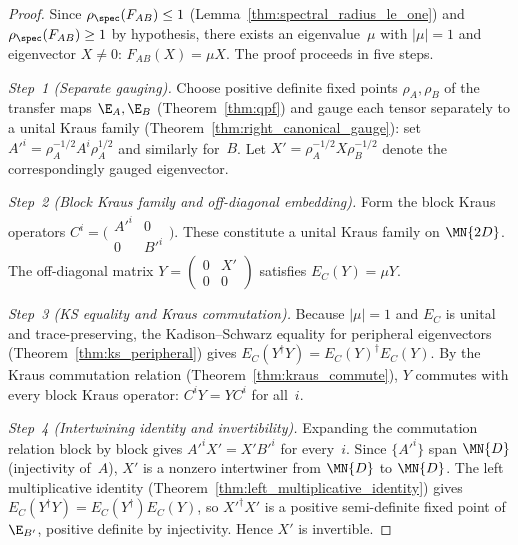 \begin{proof}
    \leanok
    Since $\rho_{\spec}(F_{AB}) \le 1$ (Lemma~\ref{thm:spectral_radius_le_one})
    and $\rho_{\spec}(F_{AB}) \ge 1$ by hypothesis, there exists an
    eigenvalue~$\mu$ with $|\mu| = 1$ and eigenvector $X \neq 0$:
    $F_{AB}(X) = \mu X$.
    The proof proceeds in five steps.

    \emph{Step~1 (Separate gauging).}
    Choose positive definite fixed points $\rho_A, \rho_B$ of the
    transfer maps $\E_A, \E_B$ (Theorem~\ref{thm:qpf}) and gauge each
    tensor separately to a unital Kraus family
    (Theorem~\ref{thm:right_canonical_gauge}): set
    $A'^i = \rho_A^{-1/2} A^i \rho_A^{1/2}$ and similarly for~$B$.
    Let $X' = \rho_A^{-1/2} X \rho_B^{-1/2}$ denote the correspondingly
    gauged eigenvector.

    \emph{Step~2 (Block Kraus family and off-diagonal embedding).}
    Form the block Kraus operators $C^i = \bigl(\begin{smallmatrix}
            A'^i & 0 \\ 0 & B'^i\end{smallmatrix}\bigr)$.
    These constitute a unital Kraus family on $\MN{2D}$.
    The off-diagonal matrix
    $Y = (\begin{smallmatrix} 0 & X' \\ 0 & 0\end{smallmatrix})$
    satisfies $E_C(Y) = \mu Y$.

    \emph{Step~3 (KS equality and Kraus commutation).}
    Because $|\mu| = 1$ and $E_C$ is unital and trace-preserving,
    the Kadison--Schwarz equality for peripheral eigenvectors
    (Theorem~\ref{thm:ks_peripheral}) gives
    $E_C(Y^\dagger Y) = E_C(Y)^\dagger E_C(Y)$.
    By the Kraus commutation relation
    (Theorem~\ref{thm:kraus_commute}), $Y$ commutes with every block
    Kraus operator: $C^i Y = Y C^i$ for all~$i$.

    \emph{Step~4 (Intertwining identity and invertibility).}
    Expanding the commutation relation block by block gives
    $A'^i X' = X' B'^i$ for every~$i$.
    Since $\{A'^i\}$ span $\MN{D}$ (injectivity of~$A$), $X'$ is a
    nonzero intertwiner from $\MN{D}$ to $\MN{D}$.
    The left multiplicative identity
    (Theorem~\ref{thm:left_multiplicative_identity})
    gives $E_C(Y^\dagger Y) = E_C(Y^\dagger) E_C(Y)$, so
    $X'^\dagger X'$ is a positive semi-definite fixed point of
    $\E_{B'}$, positive definite by injectivity.
    Hence $X'$ is invertible.


\end{proof}
